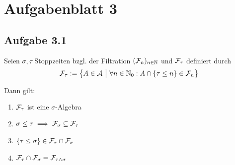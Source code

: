 
\section{Aufgabenblatt 3}
\subsection{Aufgabe 3.1}
Seien $\sigma,\tau$ Stoppzeiten bzgl. der Filtration $(\mathcal{F}_n)_{n\in\mathbb{N}}$ und $\mathcal{F}_\tau$ definiert durch
\begin{align*}
	\mathcal{F}_\tau:=\big\lbrace A\in\mathcal{A}~\big|~\forall n\in\mathbb{N}_0:A\cap\lbrace\tau\leq n\rbrace\in\mathcal{F}_n\big\rbrace
\end{align*}

Dann gilt:
\begin{enumerate}[label=\alph*)]
	\item $\mathcal{F}_\tau$ ist eine $\sigma$-Algebra
	\item $\begin{aligned}
		\sigma\leq\tau\implies\mathcal{F}_\sigma\subseteq\mathcal{F}_\tau
	\end{aligned}$
	\item $\begin{aligned}
		\lbrace\tau\leq\sigma\rbrace\in\mathcal{F}_\tau\cap\mathcal{F}_\sigma
	\end{aligned}$
	\item $\begin{aligned}
		\mathcal{F}_\tau\cap\mathcal{F}_\sigma=\mathcal{F}_{\tau\wedge\sigma}
	\end{aligned}$
\end{enumerate}

